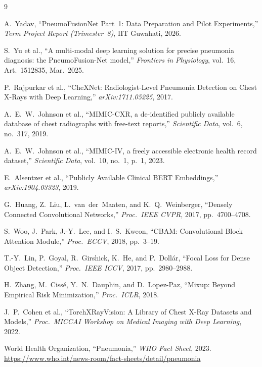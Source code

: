 \documentclass{article}
\begin{document}
\small
\begin{thebibliography}{9}

A.~Yadav, ``PneumoFusionNet Part~1: Data Preparation and Pilot Experiments,''
\emph{Term Project Report (Trimester~8)}, IIT Guwahati, 2026.

S.~Yu et al., ``A multi-modal deep learning solution for precise pneumonia
diagnosis: the PneumoFusion-Net model,'' \emph{Frontiers in Physiology},
vol.~16, Art.~1512835, Mar.\ 2025.

P.~Rajpurkar et al., ``CheXNet: Radiologist-Level Pneumonia Detection on Chest
X-Rays with Deep Learning,'' \emph{arXiv:1711.05225}, 2017.

A.~E.~W.~Johnson et al., ``MIMIC-CXR, a de-identified publicly available
database of chest radiographs with free-text reports,''
\emph{Scientific Data}, vol.~6, no.~317, 2019.

A.~E.~W.~Johnson et al., ``MIMIC-IV, a freely accessible electronic health
record dataset,'' \emph{Scientific Data}, vol.~10, no.~1, p.~1, 2023.

E.~Alsentzer et al., ``Publicly Available Clinical BERT Embeddings,''
\emph{arXiv:1904.03323}, 2019.

G.~Huang, Z.~Liu, L.~van~der~Maaten, and K.~Q.~Weinberger,
``Densely Connected Convolutional Networks,''
\emph{Proc.\ IEEE CVPR}, 2017, pp.~4700--4708.

S.~Woo, J.~Park, J.-Y.~Lee, and I.~S.~Kweon,
``CBAM: Convolutional Block Attention Module,''
\emph{Proc.\ ECCV}, 2018, pp.~3--19.

T.-Y.~Lin, P.~Goyal, R.~Girshick, K.~He, and P.~Doll{\'a}r,
``Focal Loss for Dense Object Detection,''
\emph{Proc.\ IEEE ICCV}, 2017, pp.~2980--2988.

H.~Zhang, M.~Ciss{\'e}, Y.~N.~Dauphin, and D.~Lopez-Paz,
``Mixup: Beyond Empirical Risk Minimization,''
\emph{Proc.\ ICLR}, 2018.

J.~P.~Cohen et al.,
``TorchXRayVision: A Library of Chest X-Ray Datasets and Models,''
\emph{Proc.\ MICCAI Workshop on Medical Imaging with Deep Learning}, 2022.

World Health Organization, ``Pneumonia,'' \emph{WHO Fact Sheet}, 2023.
\url{https://www.who.int/news-room/fact-sheets/detail/pneumonia}

\end{thebibliography}
\end{document}
